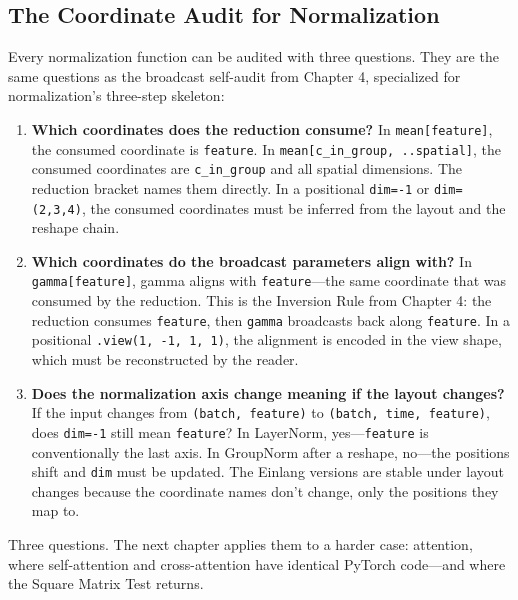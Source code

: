 \documentclass[11pt,titlepage]{article}
\begin{document}
\vspace{2em}

\hypertarget{the-coordinate-audit-for-normalization}{%
\subsection{The Coordinate Audit for
Normalization}\label{the-coordinate-audit-for-normalization}}

Every normalization function can be audited with three questions. They
are the same questions as the broadcast self-audit from Chapter 4,
specialized for normalization's three-step skeleton:

\begin{enumerate}
\def\labelenumi{\arabic{enumi}.}
\item
  \textbf{Which coordinates does the reduction consume?} In
  \texttt{mean{[}feature{]}}, the consumed coordinate is
  \texttt{feature}. In \texttt{mean{[}c\_in\_group,\ ..spatial{]}}, the
  consumed coordinates are \texttt{c\_in\_group} and all spatial
  dimensions. The reduction bracket names them directly. In a positional
  \texttt{dim=-1} or \texttt{dim=(2,3,4)}, the consumed coordinates must
  be inferred from the layout and the reshape chain.
\item
  \textbf{Which coordinates do the broadcast parameters align with?} In
  \texttt{gamma{[}feature{]}}, gamma aligns with \texttt{feature}---the
  same coordinate that was consumed by the reduction. This is the
  Inversion Rule from Chapter 4: the reduction consumes
  \texttt{feature}, then \texttt{gamma} broadcasts back along
  \texttt{feature}. In a positional \texttt{.view(1,\ -1,\ 1,\ 1)}, the
  alignment is encoded in the view shape, which must be reconstructed by
  the reader.
\item
  \textbf{Does the normalization axis change meaning if the layout
  changes?} If the input changes from \texttt{(batch,\ feature)} to
  \texttt{(batch,\ time,\ feature)}, does \texttt{dim=-1} still mean
  \texttt{feature}? In LayerNorm, yes---\texttt{feature} is
  conventionally the last axis. In GroupNorm after a reshape, no---the
  positions shift and \texttt{dim} must be updated. The Einlang versions
  are stable under layout changes because the coordinate names don't
  change, only the positions they map to.
\end{enumerate}

Three questions. The next chapter applies them to a harder case:
attention, where self-attention and cross-attention have identical
PyTorch code---and where the Square Matrix Test returns.
\end{document}
